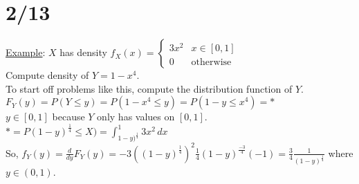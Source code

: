 \section*{2/13}
  \underline{Example}: $X$ has density $f_X(x) = \begin{cases} 3x^2 & x \in
  [0, 1] \\ 0 & \text{otherwise} \end{cases}$\\
  Compute density of $Y = 1 - x^4$.\\
  To start off problems like this, compute the distribution function of 
  $Y$.\\
  $F_Y(y) = P(Y \le y) = P(1 - x^4 \le y) = P(1 - y \le x^4) = *$\\
  $y \in [0, 1]$ because $Y$ only has values on $[0, 1]$.\\
  $* = P(1 - y)^{\frac{1}{4}} \le X) = \int_{{1 - y)^{\frac{1}{4}}}}^1 
  3x^2\,dx$\\
  So, $f_Y(y) = \frac{d}{dy} F_Y(y) = -3 ((1 - y)^{\frac{1}{4}})^2 \frac{1}{4}
  (1 - y)^{\frac{-3}{4}}(-1) = \frac{3}{4} \frac{1}{(1 - y)^{\frac{1}{4}}}$ 
  where $y \in (0,1)$.\\
